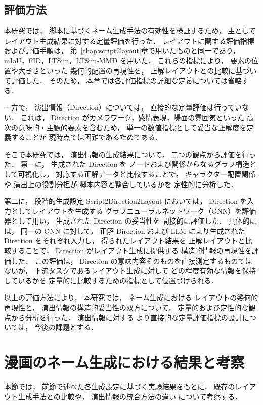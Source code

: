 \documentclass[a4j,12pt,dvipdfmx]{jsreport}
\begin{document}
\subsection{評価方法}
本研究では，
脚本に基づくネーム生成手法の有効性を検証するため，
主としてレイアウト生成結果に対する定量評価を行った．
レイアウトに関する評価指標および評価手順は，
第~\ref{chap:script2layout}章で用いたものと同一であり，
mIoU，FID，LTSim，LTSim-MMD を用いた．
これらの指標により，
要素の位置や大きさといった
幾何的配置の再現性を，
正解レイアウトとの比較に基づいて評価した．
そのため，
本章では各評価指標の詳細な定義については省略する．

一方で，
演出情報（Direction）については，
直接的な定量評価は行っていない．
これは，
Direction がカメラワーク，感情表現，場面の雰囲気といった
高次の意味的・主観的要素を含むため，
単一の数値指標として妥当な正解度を定義することが
現時点では困難であるためである．

そこで本研究では，
演出情報の生成結果について，
二つの観点から評価を行った．
第一に，
生成された Direction を
ノードおよび関係からなるグラフ構造として可視化し，
対応する正解データと比較することで，
キャラクター配置関係や
演出上の役割分担が
脚本内容と整合しているかを
定性的に分析した．

第二に，
段階的生成設定 Script2Direction2Layout においては，
Direction を入力としてレイアウトを生成する
グラフニューラルネットワーク（GNN）を評価器として用い，
生成された Direction の妥当性を
間接的に評価した．
具体的には，
同一の GNN に対して，
正解 Direction および
LLM により生成された Direction をそれぞれ入力し，
得られたレイアウト結果を
正解レイアウトと比較することで，
Direction がレイアウト生成に提供する
構造的情報の再現性を評価した．
この評価は，
Direction の意味内容そのものを直接測定するものではないが，
下流タスクであるレイアウト生成に対して
どの程度有効な情報を保持しているかを
定量的に比較するための指標として位置づけられる．

以上の評価方法により，
本研究では，
ネーム生成における
レイアウトの幾何的再現性と，
演出情報の構造的妥当性の双方について，
定量的および定性的な観点から分析を行った．
演出情報に対する
より直接的な定量評価指標の設計については，
今後の課題とする．

\section{漫画のネーム生成における結果と考察}\label{sec:script2name_results}
本節では，
前節で述べた各生成設定に基づく実験結果をもとに，
既存のレイアウト生成手法との比較や，
演出情報の統合方法の違い
について考察する．
\end{document}
